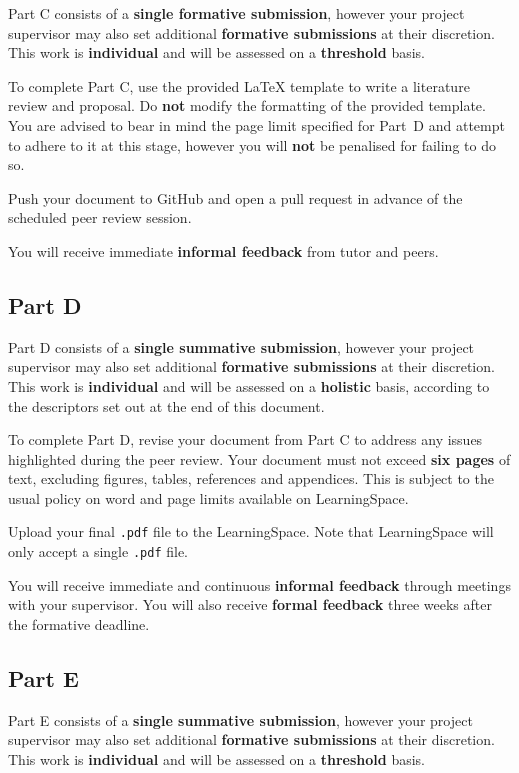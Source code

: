 \documentclass{../fal_assignment}
\begin{document}
Part C consists of a \textbf{single formative submission},
however your project supervisor may also set additional \textbf{formative submissions} at their discretion.
This work is \textbf{individual} and will be assessed on a \textbf{threshold} basis.

To complete Part C, use the provided LaTeX template to write a literature review and proposal.
Do \textbf{not} modify the formatting of the provided template.
You are advised to bear in mind the page limit specified for Part~D
and attempt to adhere to it at this stage,
however you will \textbf{not} be penalised for failing to do so.

Push your document to GitHub and open a pull request
in advance of the scheduled peer review session.

You will receive immediate \textbf{informal feedback} from tutor and peers.

\subsection*{Part D}

Part D consists of a \textbf{single summative submission},
however your project supervisor may also set additional \textbf{formative submissions} at their discretion.
This work is \textbf{individual} and will be assessed on a \textbf{holistic} basis,
according to the descriptors set out at the end of this document.

To complete Part D, revise your document from Part C
to address any issues highlighted during the peer review.
Your document must not exceed \textbf{six pages} of text,
excluding figures, tables, references and appendices.
This is subject to the usual policy on word and page limits available on LearningSpace.

Upload your final \texttt{.pdf} file to the LearningSpace.
Note that LearningSpace will only accept a single \texttt{.pdf} file.

You will receive immediate and continuous \textbf{informal feedback} through meetings with your supervisor.
You will also receive \textbf{formal feedback} three weeks after the formative deadline.

\subsection*{Part E}

Part E consists of a \textbf{single summative submission},
however your project supervisor may also set additional \textbf{formative submissions} at their discretion.
This work is \textbf{individual} and will be assessed on a \textbf{threshold} basis.
\end{document}
